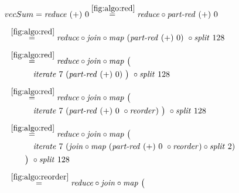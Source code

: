 \begin{figure*}[t]
\begin{align*}
  &\hspace{-1.5em}vecSum = \reduce\ (+)\ 0
%
  \overset{\ref{fig:algo:red}}{=\hspace{.2em}}
      \reduce \circ \partRed\ (+)\ 0\\[.5em]
%
  &\hspace{-2em}\quad\begin{aligned}
    &\overset{\ref{fig:algo:red}}{=\hspace{.2em}}
      \reduce \circ \join \circ \map\ (\partRed\ (+)\ 0)\ \circ \splitN\ 128
  \end{aligned}\\[.5em]
%
  &\hspace{-2em}\quad\begin{aligned}
    &\overset{\ref{fig:algo:red}}{=\hspace{.2em}}
      \reduce \circ \join \circ \map\ \big(\\
    &\qquad\quad\iterateN\ 7\ (\partRed\ (+)\ 0)\ \big)\ \circ \splitN\ 128
  \end{aligned}\\[.5em]
%
  &\hspace{-2em}\quad\begin{aligned}
    &\overset{\ref{fig:algo:red}}{=\hspace{.2em}}
      \reduce \circ \join \circ \map\ \big(\\
    &\qquad\quad\iterateN\ 7\ (\partRed\ (+)\ 0\ \circ \reorder)\ \big)\ \circ \splitN\ 128
  \end{aligned}\\[.5em]
%
  &\hspace{-2em}\quad\begin{aligned}
    &\overset{\ref{fig:algo:red}}{=\hspace{.2em}}
      \reduce \circ \join \circ \map\ \big(\\
    &\qquad\quad\iterateN\ 7\ (\join \circ \map\ (\partRed\ (+)\ 0\ \circ \reorder) \circ \splitN\ 2)\\
    &\qquad\big)\ \circ \splitN\ 128
  \end{aligned}\\[.5em]
%
  &\hspace{-2em}\quad\begin{aligned}
    &\overset{\ref{fig:algo:reorder}}{=\hspace{.2em}}
      \reduce \circ \join \circ \map\ \big(\\

\end{aligned}
\end{align*}
\end{figure*}
